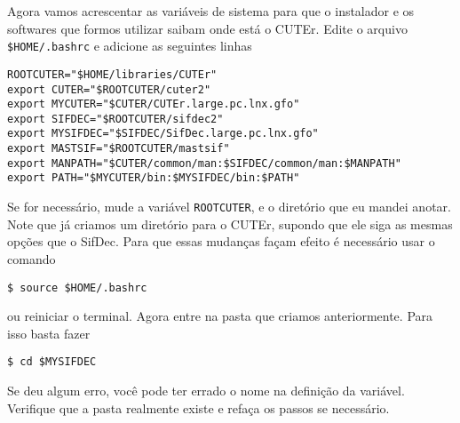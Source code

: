 \documentclass[letterpaper,11pt]{article}
\numberwithin{equation}{section}
\begin{document}
Agora vamos acrescentar as variáveis de sistema para que o instalador e os softwares
que formos utilizar saibam onde está o CUTEr. Edite o arquivo \verb+$HOME/.bashrc+ e
adicione as seguintes linhas
\begin{verbatim}
ROOTCUTER="$HOME/libraries/CUTEr"
export CUTER="$ROOTCUTER/cuter2"
export MYCUTER="$CUTER/CUTEr.large.pc.lnx.gfo" 
export SIFDEC="$ROOTCUTER/sifdec2"
export MYSIFDEC="$SIFDEC/SifDec.large.pc.lnx.gfo" 
export MASTSIF="$ROOTCUTER/mastsif" 
export MANPATH="$CUTER/common/man:$SIFDEC/common/man:$MANPATH" 
export PATH="$MYCUTER/bin:$MYSIFDEC/bin:$PATH"
\end{verbatim}
Se for necessário, mude a variável \verb+ROOTCUTER+, e o diretório que eu mandei anotar. 
Note que já criamos um diretório para o CUTEr, supondo que ele siga as mesmas opções
que o SifDec. 
Para que essas mudanças façam efeito é necessário usar o comando
\begin{verbatim}
$ source $HOME/.bashrc
\end{verbatim}
ou reiniciar o terminal.
Agora entre na pasta que criamos anteriormente. Para isso basta fazer
\begin{verbatim}
$ cd $MYSIFDEC
\end{verbatim}
Se deu algum erro, você pode ter errado o nome na definição da variável. Verifique que a
pasta realmente existe e refaça os passos se necessário.
\end{document}

